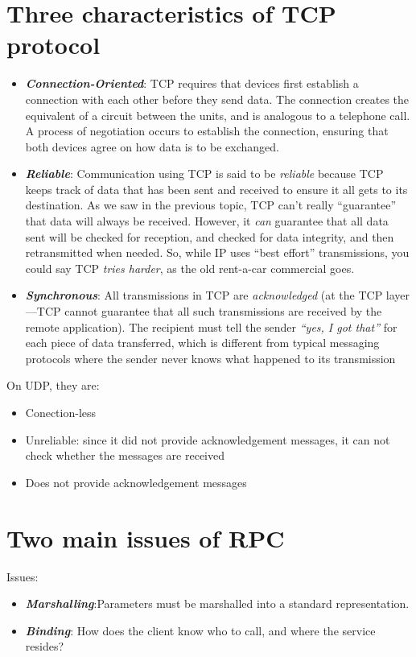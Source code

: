 \documentclass[11pt,a4paper]{article}
\begin{document}
  	\section{Three characteristics of TCP protocol}
  	\begin{itemize}
  		\item \textbf{\emph{Connection-Oriented}}: TCP requires that devices first establish a connection with each other before they send data. The connection creates the equivalent of a circuit between the units, and is analogous to a telephone call. A process of negotiation occurs to establish the connection, ensuring that both devices agree on how data is to be exchanged.
  		\item \textbf{\emph{Reliable}}: Communication using TCP is said to be \emph{reliable} because TCP keeps track of data that has been sent and received to ensure it all gets to its destination. As we saw in the previous topic, TCP can't really “guarantee” that data will always be received. However, it \emph{can} guarantee that all data sent will be checked for reception, and checked for data integrity, and then retransmitted when needed. So, while IP uses “best effort” transmissions, you could say TCP \emph{tries harder}, as the old rent-a-car commercial goes.
  		\item \textbf{\emph{Synchronous}}: All transmissions in TCP are \emph{acknowledged} (at the TCP layer—TCP cannot guarantee that all such transmissions are received by the remote application). The recipient must tell the sender \emph{“yes, I got that”} for each piece of data transferred, which is different from typical messaging protocols where the sender never knows what happened to its transmission
  	\end{itemize}
  	On UDP, they are:
  	\begin{itemize}
  		\item Conection-less
  		\item Unreliable: since it did not provide acknowledgement messages, it can not check whether the messages are received
  		\item Does not provide acknowledgement messages
  	\end{itemize}
  	
  	\section{Two main issues of RPC}
  	Issues:
  	\begin{itemize}
  		\item \textbf{\emph{Marshalling}}:Parameters must be marshalled into a standard representation.
  		\item \textbf{\emph{Binding}}: How does the client know who to call, and where the service resides?
  	\end{itemize}
  	
\end{document}
